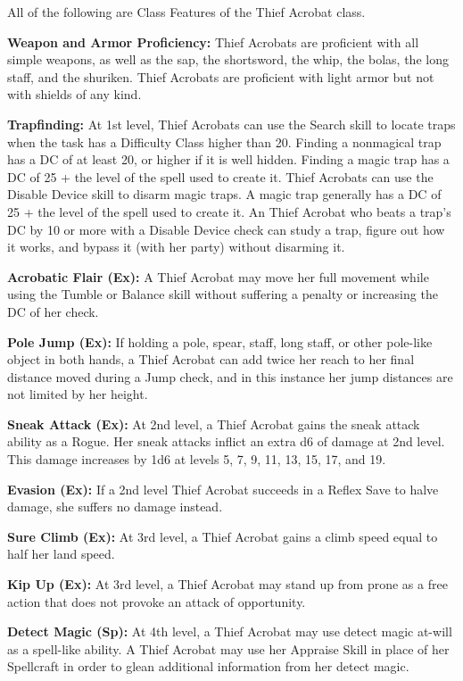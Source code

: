 \documentclass[10pt]{article}
\newcommand{\ability}[2]{\smallskip \noindent \textbf{#1} #2}
\begin{document}
\noindent All of the following are Class Features of the Thief Acrobat class.

\ability{Weapon and Armor Proficiency:}{Thief Acrobats are proficient with all simple weapons, as well as the sap, the shortsword, the whip, the bolas, the long staff, and the shuriken. Thief Acrobats are proficient with light armor but not with shields of any kind.}

\ability{Trapfinding:}{At 1st level, Thief Acrobats can use the Search skill to locate traps when the task has a Difficulty Class higher than 20. Finding a nonmagical trap has a DC of at least 20, or higher if it is well hidden. Finding a magic trap has a DC of 25 + the level of the spell used to create it. Thief Acrobats can use the Disable Device skill to disarm magic traps. A magic trap generally has a DC of 25 + the level of the spell used to create it. An Thief Acrobat who beats a trap's DC by 10 or more with a Disable Device check can study a trap, figure out how it works, and bypass it (with her party) without disarming it.}

\ability{Acrobatic Flair (Ex):}{A Thief Acrobat may move her full movement while using the Tumble or Balance skill without suffering a penalty or increasing the DC of her check.}

\ability{Pole Jump (Ex):}{If holding a pole, spear, staff, long staff, or other pole-like object in both hands, a Thief Acrobat can add twice her reach to her final distance moved during a Jump check, and in this instance her jump distances are not limited by her height.}

\ability{Sneak Attack (Ex):}{At 2nd level, a Thief Acrobat gains the sneak attack ability as a Rogue. Her sneak attacks inflict an extra d6 of damage at 2nd level. This damage increases by 1d6 at levels 5, 7, 9, 11, 13, 15, 17, and 19.}

\ability{Evasion (Ex):}{If a 2nd level Thief Acrobat succeeds in a Reflex Save to halve damage, she suffers no damage instead.}

\ability{Sure Climb (Ex):}{At 3rd level, a Thief Acrobat gains a climb speed equal to half her land speed.}

\ability{Kip Up (Ex):}{At 3rd level, a Thief Acrobat may stand up from prone as a free action that does not provoke an attack of opportunity.}

\ability{Detect Magic (Sp):}{At 4th level, a Thief Acrobat may use detect magic at-will as a spell-like ability. A Thief Acrobat may use her Appraise Skill in place of her Spellcraft in order to glean additional information from her detect magic.}
\end{document}
